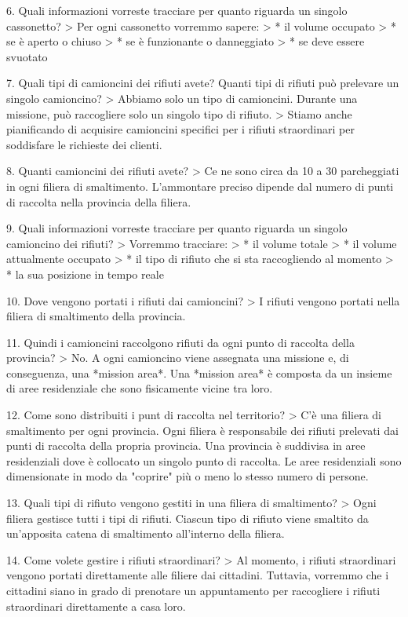 \begin{markdown}
    6. Quali informazioni vorreste tracciare per quanto riguarda un singolo cassonetto?
    > Per ogni cassonetto vorremmo sapere:
    > * il volume occupato
    > * se è aperto o chiuso
    > * se è funzionante o danneggiato
    > * se deve essere svuotato

    7. Quali tipi di camioncini dei rifiuti avete? Quanti tipi di rifiuti può prelevare un singolo camioncino?
    > Abbiamo solo un tipo di camioncini. Durante una missione, può raccogliere solo un singolo tipo di rifiuto.
    > Stiamo anche pianificando di acquisire camioncini specifici per i rifiuti straordinari per soddisfare le richieste dei clienti.

    8. Quanti camioncini dei rifiuti avete?
    > Ce ne sono circa da 10 a 30 parcheggiati in ogni filiera di smaltimento. L'ammontare preciso dipende dal numero di punti di raccolta nella provincia della filiera.

    9. Quali informazioni vorreste tracciare per quanto riguarda un singolo camioncino dei rifiuti?
    > Vorremmo tracciare:
    > * il volume totale
    > * il volume attualmente occupato
    > * il tipo di rifiuto che si sta raccogliendo al momento
    > * la sua posizione in tempo reale

    10. Dove vengono portati i rifiuti dai camioncini?
    > I rifiuti vengono portati nella filiera di smaltimento della provincia.

    11. Quindi i camioncini raccolgono rifiuti da ogni punto di raccolta della provincia?
    > No. A ogni camioncino viene assegnata una missione e, di conseguenza, una *mission area*. Una *mission area* è composta da un insieme di aree residenziale che sono fisicamente vicine tra loro.

    12. Come sono distribuiti i punt di raccolta nel territorio?
    > C'è una filiera di smaltimento per ogni provincia. Ogni filiera è responsabile dei rifiuti prelevati dai punti di raccolta della propria provincia. Una provincia è suddivisa in aree residenziali dove è collocato un singolo punto di raccolta. Le aree residenziali sono dimensionate in modo da "coprire" più o meno lo stesso numero di persone.

    13. Quali tipi di rifiuto vengono gestiti in una filiera di smaltimento?
    > Ogni filiera gestisce tutti i tipi di rifiuti. Ciascun tipo di rifiuto viene smaltito da un'apposita catena di smaltimento all'interno della filiera.

    14. Come volete gestire i rifiuti straordinari?
    > Al momento, i rifiuti straordinari vengono portati direttamente alle filiere dai cittadini. Tuttavia, vorremmo che i cittadini siano in grado di prenotare un appuntamento per raccogliere i rifiuti straordinari direttamente a casa loro.
\end{markdown}